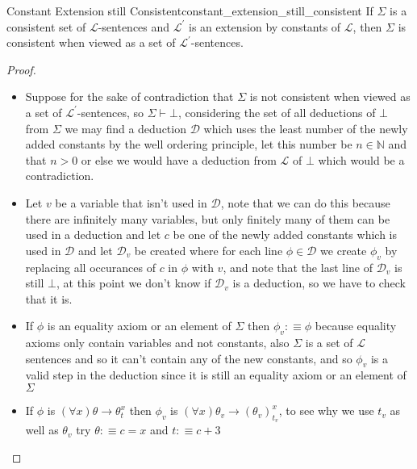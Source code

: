 \begin{lemma}{Constant Extension still Consistent}{constant_extension_still_consistent}
If $\Sigma$ is a consistent set of $\mathcal{L}$-sentences and $\mathcal{L}^{\prime}$ is an extension by constants of $\mathcal{L}$, then $\Sigma$ is consistent when viewed as a set of $\mathcal{L}^{\prime}$-sentences.
\end{lemma}
\begin{proof}
    \begin{itemize}
        \item Suppose for the sake of contradiction that $ \Sigma  $ is not consistent when viewed as a set of $\mathcal{L}^{\prime}$-sentences, so $ \Sigma \vdash \bot $, considering the set of all deductions of $ \bot  $ from $ \Sigma  $ we may find a deduction $ \mathcal{ D }   $  which uses the least number of the newly added constants by the well ordering principle, let this number be $ n \in  \mathbb{N} $ and that $ n > 0 $ or else we would have a deduction from $ \mathcal{ L }   $ of $ \bot  $ which would be a contradiction.
        \item Let $ v $ be a variable that isn't used in $ \mathcal{ D }   $, note that we can do this because there are infinitely many variables, but only finitely many of them can be used in a deduction and let $ c $ be one of the newly added constants which is used in $ \mathcal{ D }   $ and let $ \mathcal{ D } _{ v }   $ be created where for each line $ \phi \in  \mathcal{ D }  $ we create $ \phi _{ v }  $ by replacing all occurances of $ c $ in $ \phi  $ with $ v $, and note that the last line of $ \mathcal{ D } _{ v }   $ is still $ \bot  $, at this point we don't know if $ \mathcal{ D } _{ v }   $ is a deduction, so we have to check that it is.
        \item If $ \phi  $ is an equality axiom or an element of $ \Sigma $ then $ \phi _{ v } :\equiv \phi  $ because equality axioms only contain variables and not constants, also $ \Sigma  $ is a set of $ \mathcal{ L }   $ sentences and so it can't contain any of the new constants, and so $ \phi _{ v }  $ is a valid step in the deduction since it is still an equality axiom or an element of $ \Sigma  $ 
        \item If $ \phi  $ is $ \left( \forall x \right) \theta \rightarrow \theta _{ t }^{ x }  $ then $ \phi _{ v }  $ is $ \left( \forall x \right)\theta _{ v } \rightarrow \left( \theta _{ v }  \right) _{ t _{ v }  }^{ x  }  $, to see why we use $ t _{ v }  $ as well as $ \theta _{ v }  $ try $ \theta :\equiv c =  x $ and $ t :\equiv   c + 3 $ 
    \end{itemize}
\end{proof}
